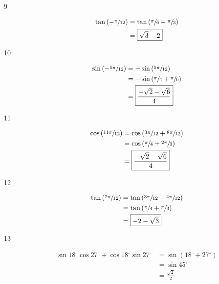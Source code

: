 \documentclass{exam}
\newcommand{\dg}{\ensuremath{^\circ}}
\begin{document}
\begin{description}
      \item[9] 
        \begin{align*}
          \tan \left( - \sfrac{\pi}{12} \right) &= \tan \left( \sfrac{\pi}{6} - \sfrac{\pi}{3} \right) \\
          &= \boxed{ \sqrt{3} - 2 } \\
        \end{align*}

      \item[10] 
        \begin{align*}
          \sin \left( - \sfrac{5 \pi}{12} \right) & = - \sin \left( \sfrac{5 \pi}{12} \right) \\
                                                  & = - \sin \left( \sfrac{\pi}{4} + \sfrac{\pi}{6} \right) \\
                                                  & = \boxed{ \frac{- \sqrt{2} - \sqrt{6}}{4} } \\
        \end{align*}

      \item[11] 
        \begin{align*}
          \cos \left( \sfrac{11 \pi}{12} \right) & = \cos \left( \sfrac{3 \pi}{12} + \sfrac{8 \pi}{12} \right) \\
                                                 & = \cos \left( \sfrac{\pi}{4} + \sfrac{2 \pi}{3} \right) \\
                                                 & = \boxed{ \frac{- \sqrt{2} - \sqrt{6}}{4} } \\
        \end{align*}

      \item[12] 
        \begin{align*}
          \tan \left( \sfrac{7 \pi}{12} \right) & = \tan \left( \sfrac{3 \pi}{12} + \sfrac{4 \pi}{12} \right) \\
                                                & = \tan \left( \sfrac{\pi}{4} + \sfrac{\pi}{3} \right) \\
                                                & = \boxed{ -2 - \sqrt{3} } \\
        \end{align*}

      \item[13] 
        \begin{align*}
          \sin 18 \dg \cos 27 \dg + \cos 18 \dg \sin 27 \dg & = \sin (18 \dg + 27 \dg) \\
                                                            & = \sin 45 \dg \\
                                                            & = \boxed{ \frac{\sqrt{2}}{2} } \\
        \end{align*}


\end{description}
\end{document}
